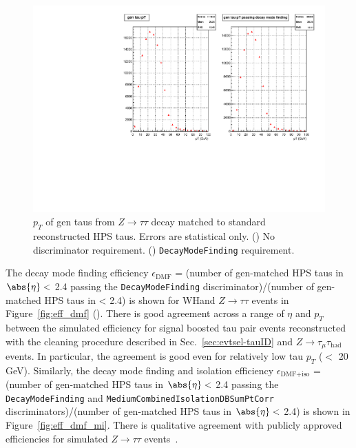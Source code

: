 \begin{figure}[hbtp]
  \begin{center}
    \includegraphics[width=\cmsFigWidth]{figures/gentau_pt_ztt_dmf}
    \caption{$p_T$ of gen taus from $Z\rightarrow\tau\tau$ decay matched to standard reconstructed HPS taus.  Errors are statistical only.  (\cmsLeft) No discriminator requirement.  (\cmsRight) \texttt{DecayModeFinding} requirement.}
    \label{fig:gen_ztt}
  \end{center}
\end{figure}

The decay mode finding efficiency $\epsilon_{\text{DMF}}$ = (number of gen-matched HPS taus in $\abs{\eta} <$ 2.4 passing the \texttt{DecayModeFinding} discriminator)/(number of gen-matched HPS taus in \abs{\eta} \textless\xspace 2.4) is shown for WHand $Z\rightarrow\tau\tau$ events in Figure~\ref{fig:eff_dmf} (\cmsLeft).  There is good agreement across a range of $\eta$ and $p_T$ between the simulated efficiency for signal boosted tau pair events reconstructed with the cleaning procedure described in Sec.~\ref{sec:evtsel-tauID} and $Z\rightarrow\tau_{\mu}\tau_{\text{had}}$ events.  In particular, the agreement is good even for relatively low tau $p_T$ ($<$ 20 GeV).  Similarly, the decay mode finding and isolation efficiency $\epsilon_{\text{DMF+iso}}$ = (number of gen-matched HPS taus in $\abs{\eta} <$ 2.4 passing the \texttt{DecayModeFinding} and \texttt{MediumCombinedIsolationDBSumPtCorr} discriminators)/(number of gen-matched HPS taus in $\abs{\eta} <$ 2.4) is shown in Figure~\ref{fig:eff_dmf_mi}. There is qualitative agreement with publicly approved efficiencies for simulated $Z\rightarrow\tau\tau$ events~\cite{CMS:approvedTAUResults}.

